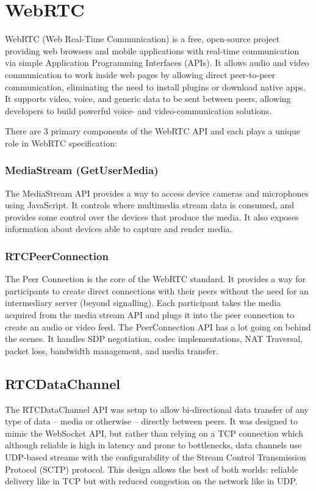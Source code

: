 \section{WebRTC}

WebRTC (Web Real-Time Communication) is a free, open-source project providing web browsers and 
mobile applications with real-time communication via simple Application Programming Interfaces (APIs). 
It allows audio and video communication to work inside web pages by allowing direct peer-to-peer 
communication, eliminating the need to install plugins or download native apps.
It supports video, voice, and generic data to be sent between peers, allowing developers 
to build powerful voice- and video-communication solutions.~\cite{wikiWebRTC}

There are 3 primary components of the WebRTC API and each plays a unique role in WebRTC specification:

\subsubsection{MediaStream (GetUserMedia)}

The MediaStream API provides a way to access device cameras and microphones using JavaScript. 
It controls where multimedia stream data is consumed, and provides some control over the devices 
that produce the media. It also exposes information about devices able to capture and render media.

\subsubsection{RTCPeerConnection}

The Peer Connection is the core of the WebRTC standard. It provides a way for participants to 
create direct connections with their peers without the need for an intermediary 
server (beyond signalling). Each participant takes the media acquired from the media 
stream API and plugs it into the peer connection to create an audio or video feed.  
The PeerConnection API has a lot going on behind the scenes. It handles SDP negotiation, 
codec implementations, NAT Traversal, packet loss, bandwidth management, and media transfer.

\subsection{RTCDataChannel}

The RTCDataChannel API was setup to allow bi-directional data transfer of any 
type of data -- media or otherwise -- directly between peers. It was designed to mimic the 
WebSocket API, but rather than relying on a TCP connection which although reliable is high 
in latency and prone to bottlenecks, data channels use UDP-based streams with the configurability 
of the Stream Control Transmission Protocol (SCTP) protocol. This design allows the best 
of both worlds: reliable delivery like in TCP but with reduced congestion on the network like in UDP.

